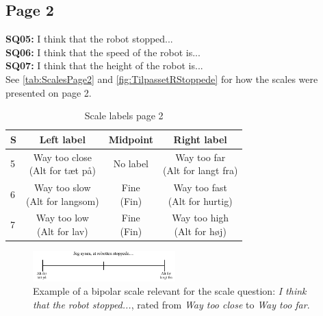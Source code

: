 \subsection{Page 2}
\noindent
\textbf{SQ05:} I think that the robot stopped... \\%
\textbf{SQ06:} I think that the speed of the robot is... \\%
\textbf{SQ07:} I think that the height of the robot is... \\%
See \autoref{tab:ScalesPage2} and \autoref{fig:TilpassetRStoppede} for how the scales were presented on page 2.
\begin{table}[H]
	\centering
\caption{Scale labels page 2}
	\label{tab:ScalesPage2} 
	\begin{tabular}{l|c|c|c}
		S     & Left label & Midpoint & Right label \\\hline
		5   & \makecell{Way too close\\(Alt for tæt på)}  & No label & \makecell{Way too far \\(Alt for langt fra)}        \\\hline
		6   & \makecell{Way too slow\\(Alt for langsom)} & \makecell{Fine\\(Fin)} & \makecell{Way too fast \\(Alt for hurtig)}         \\\hline
		7   & \makecell{Way too low \\(Alt for lav)} & \makecell{Fine\\(Fin)} & \makecell{Way too high\\(Alt for høj)}                
	\end{tabular}        
\end{table}
\noindent
%
\begin{figure}[H]
\centering
\includegraphics[width = 0.49\textwidth]{Figure/TilpassetRStoppede}
\setlength{} 
\caption{Example of a bipolar scale relevant for the scale question: \textit{I think that the robot stopped...}, rated from \textit{Way too close} to \textit{Way too far}.}
\label{fig:TilpassetRStoppede}
\end{figure}
\noindent
% 
